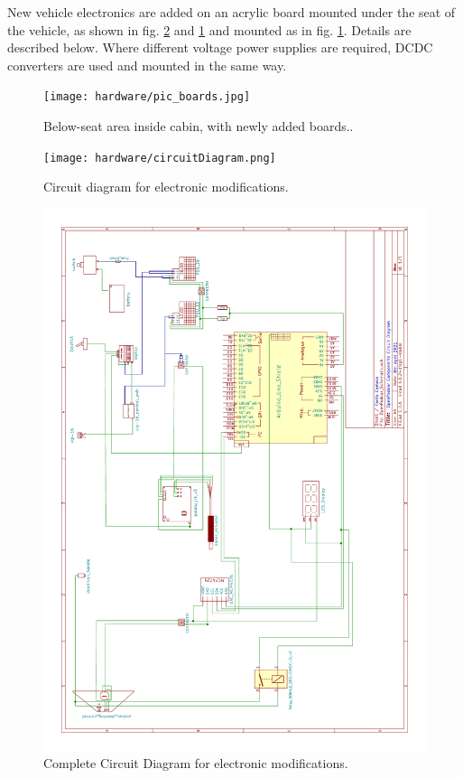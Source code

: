 \documentclass[a4paper]{article}
\begin{document}
New vehicle electronics are added on an acrylic board mounted under the seat of the vehicle, as shown in fig. \ref{fig:circuitDiagram} and \ref{fig:actuatorMounted} and mounted as in fig. \ref{fig:actuatorMounted}. Details are described below.  Where different voltage power supplies are required, DCDC converters are used and mounted in the same way.

\begin{figure}[h]
	\texttt{[image: hardware/pic\_boards.jpg]}
	\caption{Below-seat area inside cabin, with newly added boards..}
	\label{fig:actuatorMounted}
\end{figure}

\begin{figure}[h]
	\texttt{[image: hardware/circuitDiagram.png]}
	\caption{Circuit diagram for electronic modifications.}
	\label{fig:circuitDiagram}
\end{figure}

\begin{figure}
	\centering
	\includegraphics[width=0.9\linewidth]{hardware/OpenPodcar_Components_Circuit_Diagram_colored.pdf}
	\caption{Complete Circuit Diagram for electronic modifications.}
	\label{fig:CompleteCircuitDiagram}
\end{figure}
\end{document}
